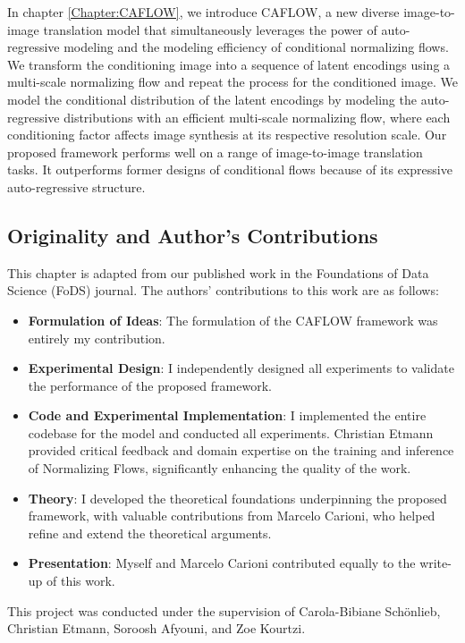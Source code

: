 In chapter \ref{Chapter:CAFLOW}, we introduce CAFLOW, a new diverse image-to-image translation model that simultaneously leverages the power of auto-regressive modeling and the modeling efficiency of conditional normalizing flows. We transform the conditioning image into a sequence of latent encodings using a multi-scale normalizing flow and repeat the process for the conditioned image. We model the conditional distribution of the latent encodings by modeling the auto-regressive distributions with an efficient multi-scale normalizing flow, where each conditioning factor affects image synthesis at its respective resolution scale. Our proposed framework performs well on a range of image-to-image translation tasks. It outperforms former designs of conditional flows because of its expressive auto-regressive structure.


\subsection*{Originality and Author’s Contributions}

This chapter is adapted from our published work \cite{batzolis2024caflow} in the Foundations of Data Science (FoDS) journal. The authors' contributions to this work are as follows:

\begin{itemize}
\item \textbf{Formulation of Ideas}: The formulation of the CAFLOW framework was entirely my contribution.
\item \textbf{Experimental Design}: I independently designed all experiments to validate the performance of the proposed framework.
\item \textbf{Code and Experimental Implementation}: I implemented the entire codebase for the model and conducted all experiments. Christian Etmann provided critical feedback and domain expertise on the training and inference of Normalizing Flows, significantly enhancing the quality of the work.
\item \textbf{Theory}: I developed the theoretical foundations underpinning the proposed framework, with valuable contributions from Marcelo Carioni, who helped refine and extend the theoretical arguments.
\item \textbf{Presentation}: Myself and Marcelo Carioni contributed equally to the write-up of this work.
\end{itemize}

This project was conducted under the supervision of Carola-Bibiane Sch\"onlieb, Christian Etmann, Soroosh Afyouni, and Zoe Kourtzi. 

